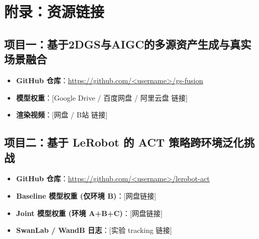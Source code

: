 \documentclass[12pt,a4paper]{ctexart}
\begin{document}

\newpage
\section*{附录：资源链接}

\subsection*{项目一：基于2DGS与AIGC的多源资产生成与真实场景融合}

\begin{itemize}[leftmargin=*]
    \item \textbf{GitHub 仓库}：\url{https://github.com/<username>/gs-fusion}
    \item \textbf{模型权重}：[Google Drive / 百度网盘 / 阿里云盘 链接]
    \item \textbf{渲染视频}：[网盘 / B站 链接]
\end{itemize}

\subsection*{项目二：基于 LeRobot 的 ACT 策略跨环境泛化挑战}

\begin{itemize}[leftmargin=*]
    \item \textbf{GitHub 仓库}：\url{https://github.com/<username>/lerobot-act}
    \item \textbf{Baseline 模型权重 (仅环境 B)}：[网盘链接]
    \item \textbf{Joint 模型权重 (环境 A+B+C)}：[网盘链接]
    \item \textbf{SwanLab / WandB 日志}：[实验 tracking 链接]
\end{itemize}
\end{document}
